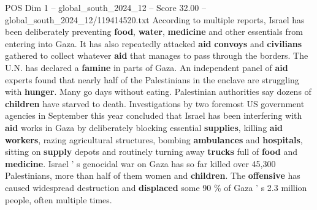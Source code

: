 \begin{textsample}{POS Dim 1 – global\_south\_2024\_12 – Score 32.00 – global\_south\_2024\_12/119414520.txt}
According to multiple reports, Israel has been deliberately preventing \textbf{food}, \textbf{water}, \textbf{medicine} and other essentials from entering into Gaza.
It has also repeatedly attacked \textbf{aid} \textbf{convoys} and \textbf{civilians} gathered to collect whatever \textbf{aid} that manages to pass through the borders.
The U.N. has declared a \textbf{famine} in parts of Gaza.
An independent panel of \textbf{aid} experts found that nearly half of the Palestinians in the enclave are struggling with \textbf{hunger}.
Many go days without eating.
Palestinian authorities say dozens of \textbf{children} have starved to death.
Investigations by two foremost US government agencies in September this year concluded that Israel has been interfering with \textbf{aid} works in Gaza by deliberately blocking essential \textbf{supplies}, killing \textbf{aid} \textbf{workers}, razing agricultural structures, bombing \textbf{ambulances} and \textbf{hospitals}, sitting on \textbf{supply} depots and routinely turning away \textbf{trucks} full of \textbf{food} and \textbf{medicine}.
Israel ' s genocidal war on Gaza has so far killed over 45,300 Palestinians, more than half of them women and \textbf{children}.
The \textbf{offensive} has caused widespread destruction and \textbf{displaced} some 90 \% of Gaza ' s 2.3 million people, often multiple times.

\end{textsample}
